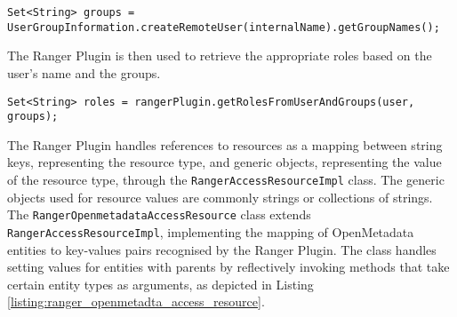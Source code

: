 \begin{verbatim}
Set<String> groups = UserGroupInformation.createRemoteUser(internalName).getGroupNames();
\end{verbatim}

The Ranger Plugin is then used to retrieve the appropriate roles based on the user's name and the groups.

\begin{verbatim}
Set<String> roles = rangerPlugin.getRolesFromUserAndGroups(user, groups);
\end{verbatim}

The Ranger Plugin handles references to resources as a mapping between string keys, representing the resource type, and generic objects, representing the value of the resource type, through the \texttt{RangerAccessResourceImpl} class. The generic objects used for resource values are commonly strings or collections of strings. The \texttt{RangerOpenmetadataAccessResource} class extends \texttt{RangerAccessResourceImpl}, implementing the mapping of OpenMetadata entities to key-values pairs recognised by the Ranger Plugin. The class handles setting values for entities with parents by reflectively invoking methods that take certain entity types as arguments, as depicted in Listing \ref{listing:ranger_openmetadta_access_resource}.

